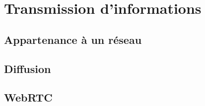 

\part{Transmission d'informations}

\chapter{Appartenance à un réseau}

\chapter{Diffusion}

\chapter{WebRTC}